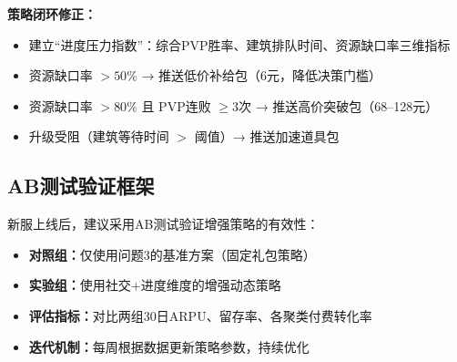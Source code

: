 \textbf{策略闭环修正：}
\begin{itemize}
    \item 建立``进度压力指数''：综合PVP胜率、建筑排队时间、资源缺口率三维指标
    \item 资源缺口率 $> 50\%$ → 推送低价补给包（6元，降低决策门槛）
    \item 资源缺口率 $> 80\%$ 且 PVP连败 $\geq 3$次 → 推送高价突破包（68--128元）
    \item 升级受阻（建筑等待时间 $>$ 阈值）→ 推送加速道具包
\end{itemize}

\subsection{AB测试验证框架}

新服上线后，建议采用AB测试验证增强策略的有效性：
\begin{itemize}
    \item \textbf{对照组：}仅使用问题3的基准方案（固定礼包策略）
    \item \textbf{实验组：}使用社交$+$进度维度的增强动态策略
    \item \textbf{评估指标：}对比两组30日ARPU、留存率、各聚类付费转化率
    \item \textbf{迭代机制：}每周根据数据更新策略参数，持续优化
\end{itemize}

